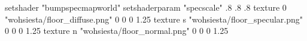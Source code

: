setshader "bumpspecmapworld"
setshaderparam "specscale" .8 .8 .8
texture 0 "wohsiesta/floor_diffuse.png" 0 0 0 1.25
texture s "wohsiesta/floor_specular.png" 0 0 0 1.25
texture n "wohsiesta/floor_normal.png" 0 0 0 1.25